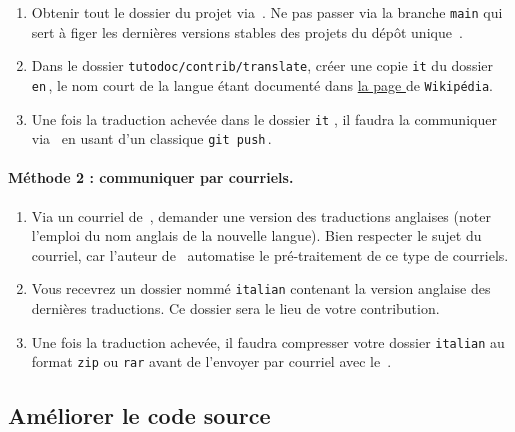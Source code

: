 \begin{enumerate}
    \item Obtenir tout le dossier du projet via \thisrepo\,.
    Ne pas passer via la branche \verb#main# qui sert à figer les dernières versions stables des projets du dépôt unique \thismonorepo\,.

    \item Dans le dossier \verb#tutodoc/contrib/translate#, créer une copie \verb#it# du dossier \verb#en#\,, le nom court de la langue étant documenté dans
    \href{https://en.wikipedia.org/wiki/IETF_language_tag#List_of_common_primary_language_subtags}%
         {la page }
    de \texttt{Wikipédia}.

    \item Une fois la traduction achevée dans le dossier \verb#it# , il faudra la communiquer via \thisrepo\ en usant d'un classique \verb#git push#\,.
\end{enumerate}


\paragraph{Méthode 2 : communiquer par courriels.}

\begin{enumerate}
    \item Via un courriel de \,, demander une version des traductions anglaises (noter l'emploi du nom anglais de la nouvelle langue).
    Bien respecter le sujet du courriel, car l'auteur de \thisproj\ automatise le pré-traitement de ce type de courriels.

    \item Vous recevrez un dossier nommé \verb#italian# contenant la version anglaise des dernières traductions.
    Ce dossier sera le lieu de votre contribution.

    \item Une fois la traduction achevée, il faudra compresser votre dossier \verb#italian# au format \verb#zip# ou \verb#rar# avant de l'envoyer par courriel avec le \,.
\end{enumerate}



\subsection{Améliorer le code source}

